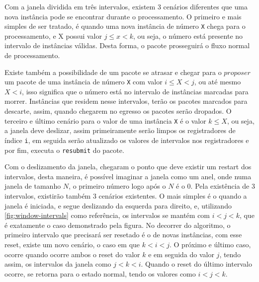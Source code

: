 \documentclass[12pt,
openright, 
oneside,
a4paper,
brazil]{facom-ufu-abntex2}
\theoremstyle{definition}
\begin{document}
Com a janela dividida em três intervalos, existem 3 cenários diferentes que uma nova instância pode se encontrar durante o
processamento. O primeiro e mais simples de ser tratado, é quando uma nova instância de número \texttt{X} chega para
o processamento, e X possui valor $j \leq x < k$, ou seja, o número está presente no intervalo de instâncias válidas. 
Desta forma, o pacote prosseguirá o fluxo normal de processamento.

Existe também a possibilidade de um pacote se atrasar e chegar para o $proposer$ um pacote de uma instância de número
\texttt{X} com valor $i \leq X < j$, ou até mesmo $X < i$, isso significa que o número está no intervalo de instâncias
marcadas para morrer. Instâncias que residem nesse intervalos, terão os pacotes marcados para descarte, assim, quando
chegarem no egresso os pacotes serão dropados.
O terceiro e último cenário para o valor de uma instância \texttt{X} é o valor $k \leq X$, ou seja, a janela deve deslizar,
assim primeiramente serão limpos os registradores de índice \texttt{i}, em seguida serão atualizado os valores de
intervalos nos registradores e por fim, executa o \texttt{resubmit} do pacote.

Com o deslizamento da janela, chegaram o ponto que deve existir um restart dos intervalos, desta maneira, é possível
imaginar a janela como um anel, onde numa janela de tamanho $N$, o primeiro número logo após o $N$ é o 0. Pela 
existência de 3 intervalos, existirão também 3 cenários existentes. O mais simples é o quando a janela é iniciada,
e segue deslizando da esquerda para direito, e, utilizando \ref{fig:window-intervals} como referência, os intervalos
se mantém com $i < j < k$, que é exatamente o caso demonstrado pela figura. No decorrer do algoritmo, o primeiro intervalo
que precisará ser resetado é o de novas instâncias, com esse reset, existe um novo cenário, o caso em que $k < i < j$.
O próximo e último caso, ocorre quando ocorre ambos o reset do valor $k$ e em seguida do valor $j$, tendo assim,
os intervalos da janela como $j < k < i$. Quando o reset do último intervalo ocorre, se retorna para o estado normal,
tendo os valores como $i < j < k$.
\end{document}
